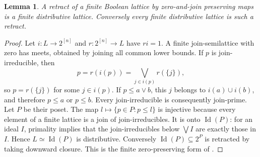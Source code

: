 \documentclass[11pt]{amsart}
\DeclareMathOperator{\Id}{Id}
\newtheorem{lemma}[theorem]{Lemma}
\theoremstyle{definition}
\theoremstyle{remark}
\begin{document}
\begin{lemma}\label{lem:lattice}
A retract of a finite Boolean lattice by zero-and-join preserving maps is a finite distributive lattice. Conversely every finite distributive lattice is such a retract.
\end{lemma}
\begin{proof}
Let $i:L\to2^{[n]}$ and $r:2^{[n]}\to L$ have $ri=1$. A finite join-semilattice with zero has meets, obtained by joining all common lower bounds. If $p$ is join-irreducible, then
\[
 p=r(i(p))=\bigvee_{j\in i(p)}r(\{j\}),
\]
so $p=r(\{j\})$ for some $j\in i(p)$. If $p\le a\vee b$, this $j$ belongs to $i(a)\cup i(b)$, and therefore $p\le a$ or $p\le b$. Every join-irreducible is consequently join-prime. Let $P$ be their poset. The map $l\mapsto\{p\in P:p\le l\}$ is injective because every element of a finite lattice is a join of join-irreducibles. It is onto $\Id(P)$: for an ideal $I$, primality implies that the join-irreducibles below $\bigvee I$ are exactly those in $I$. Hence $L\simeq\Id(P)$ is distributive. Conversely $\Id(P)\subseteq2^P$ is retracted by taking downward closure. This is the finite zero-preserving form of \cite[Theorem~5.3]{HK}.
\end{proof}
\end{document}
